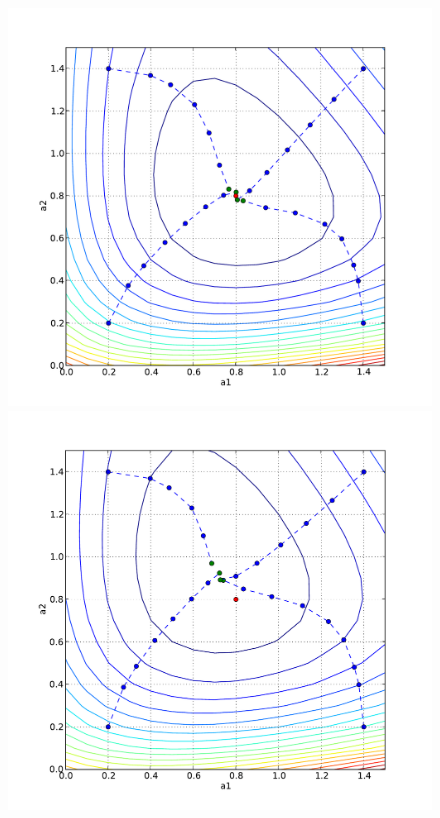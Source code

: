 \begin{figure}
  \begin{center}
    \includegraphics[width=\smallfig]{chapters/schroll/pdf/a1a2scan4.pdf}
    \includegraphics[width=\smallfig]{chapters/schroll/pdf/a1a2scan4-5.pdf}

\end{center}
\end{figure}
